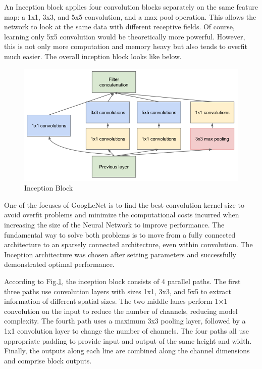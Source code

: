 \documentclass[peerreview]{IEEEtran}
\begin{document}
An Inception block applies four convolution blocks separately on the same feature map: a 1x1, 3x3, and 5x5 convolution, and a max pool operation. This allows the network to look at the same data with different receptive fields. Of course, learning only 5x5 convolution would be theoretically more powerful. However, this is not only more computation and memory heavy but also tends to overfit much easier. The overall inception block looks like below.

\begin{figure}[H]
    \centering
    \includegraphics[width=0.8\columnwidth]{inception_block}
    \caption{Inception Block}
    \label{fig:inception_block}
\end{figure}

One of the focuses of GoogLeNet is to find the best convolution kernel size to avoid overfit problems and minimize the computational costs incurred when increasing the size of the Neural Network to improve performance. The fundamental way to solve both problems is to move from a fully connected architecture to an sparsely connected architecture, even within convolution. The Inception architecture was chosen after setting parameters and successfully demonstrated optimal performance.

According to Fig.\ref{fig:inception_block}, the inception block consists of 4 parallel paths. The first three paths use convolution layers with sizes 1x1, 3x3, and 5x5 to extract information of different spatial sizes. The two middle lanes perform 1×1 convolution on the input to reduce the number of channels, reducing model complexity. The fourth path uses a maximum 3x3 pooling layer, followed by a 1x1 convolution layer to change the number of channels. The four paths all use appropriate padding to provide input and output of the same height and width. Finally, the outputs along each line are combined along the channel dimensions and comprise block outputs.
\end{document}
